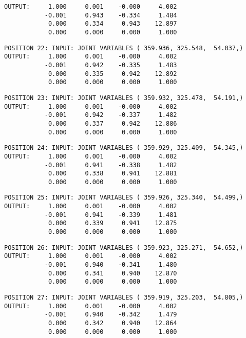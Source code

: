 \begin{verbatim}
OUTPUT:     1.000     0.001    -0.000     4.002
           -0.001     0.943    -0.334     1.484
            0.000     0.334     0.943    12.897
            0.000     0.000     0.000     1.000
\end{verbatim} \pagebreak[1]\begin{verbatim}
POSITION 22: INPUT: JOINT VARIABLES ( 359.936, 325.548,  54.037,)
OUTPUT:     1.000     0.001    -0.000     4.002
           -0.001     0.942    -0.335     1.483
            0.000     0.335     0.942    12.892
            0.000     0.000     0.000     1.000
\end{verbatim} \pagebreak[1]\begin{verbatim}
POSITION 23: INPUT: JOINT VARIABLES ( 359.932, 325.478,  54.191,)
OUTPUT:     1.000     0.001    -0.000     4.002
           -0.001     0.942    -0.337     1.482
            0.000     0.337     0.942    12.886
            0.000     0.000     0.000     1.000
\end{verbatim} \pagebreak[1]\begin{verbatim}
POSITION 24: INPUT: JOINT VARIABLES ( 359.929, 325.409,  54.345,)
OUTPUT:     1.000     0.001    -0.000     4.002
           -0.001     0.941    -0.338     1.482
            0.000     0.338     0.941    12.881
            0.000     0.000     0.000     1.000
\end{verbatim} \pagebreak[1]\begin{verbatim}
POSITION 25: INPUT: JOINT VARIABLES ( 359.926, 325.340,  54.499,)
OUTPUT:     1.000     0.001    -0.000     4.002
           -0.001     0.941    -0.339     1.481
            0.000     0.339     0.941    12.875
            0.000     0.000     0.000     1.000
\end{verbatim} \pagebreak[1]\begin{verbatim}
POSITION 26: INPUT: JOINT VARIABLES ( 359.923, 325.271,  54.652,)
OUTPUT:     1.000     0.001    -0.000     4.002
           -0.001     0.940    -0.341     1.480
            0.000     0.341     0.940    12.870
            0.000     0.000     0.000     1.000
\end{verbatim} \pagebreak[1]\begin{verbatim}
POSITION 27: INPUT: JOINT VARIABLES ( 359.919, 325.203,  54.805,)
OUTPUT:     1.000     0.001    -0.000     4.002
           -0.001     0.940    -0.342     1.479
            0.000     0.342     0.940    12.864
            0.000     0.000     0.000     1.000
\end{verbatim} \pagebreak[1]\begin{verbatim}

\end{verbatim}
